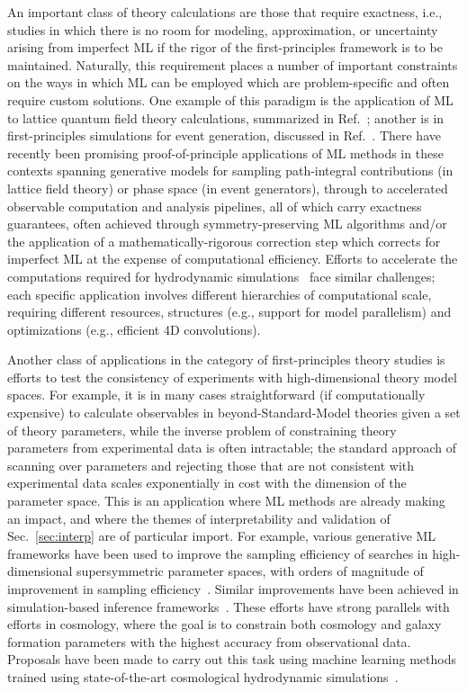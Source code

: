 \documentclass[submission,Phys]{SciPost}
\begin{document}
An important class of theory calculations are those that require exactness, i.e., studies in which there is no room for modeling, approximation, or uncertainty arising from imperfect ML if the rigor of the first-principles framework is to be maintained. Naturally, this requirement places a number of important constraints on the ways in which ML can be employed which are problem-specific and often require custom solutions. One example of this paradigm is the application of ML to lattice quantum field theory calculations, summarized in Ref.~\cite{Boyda:2022nmh}; another is in first-principles simulations for event generation, discussed in Ref.~\cite{Butter:2022rso}. There have recently been promising proof-of-principle applications of ML methods in these contexts spanning generative models for sampling path-integral contributions (in lattice field theory) or phase space (in event generators), through to accelerated observable computation and analysis pipelines, all of which carry exactness guarantees, often achieved through symmetry-preserving ML algorithms and/or the application of a mathematically-rigorous correction step which corrects for imperfect ML at the expense of computational efficiency. %
Efforts to accelerate the computations required for hydrodynamic simulations~\cite{Dvorkin:2022pwo} face similar challenges; each specific application involves different hierarchies of computational scale, requiring different resources, structures (e.g., support for model parallelism) and optimizations (e.g., efficient 4D convolutions).

Another class of applications in the category of first-principles theory studies is efforts to test the consistency of experiments with high-dimensional theory model spaces. For example, it is in many cases straightforward (if computationally expensive) to calculate observables in beyond-Standard-Model theories given a set of theory parameters, while the inverse problem of constraining theory parameters from experimental data is often intractable; the standard approach of scanning over parameters and rejecting those that are not consistent with experimental data scales exponentially in cost with the dimension of the parameter space. This is an application where ML methods are already making an impact, and where the themes of interpretability and validation of Sec.~\ref{sec:interp} are of particular import. For example, various generative ML frameworks have been used to improve the sampling efficiency of searches in high-dimensional supersymmetric parameter spaces, with orders of magnitude of improvement in sampling efficiency~\cite{Hollingsworth:2021sii}. Similar improvements have been achieved in simulation-based inference frameworks~\cite{Morrison:2022vqe}. These efforts have strong parallels with efforts in cosmology, where the goal is to constrain both cosmology and galaxy formation parameters with the highest accuracy from observational data. Proposals have been made to carry out this task using machine learning methods trained using state-of-the-art cosmological hydrodynamic simulations~\cite{Dvorkin:2022pwo}.
\end{document}
